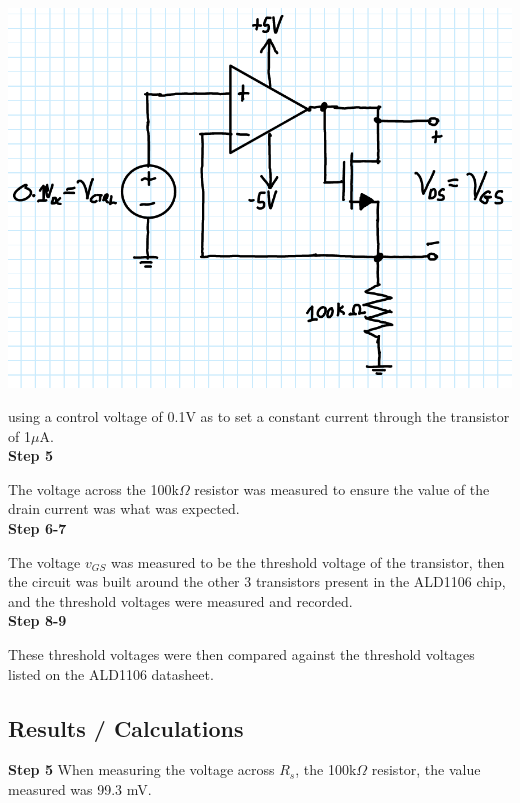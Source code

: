 \documentclass[notitlepage, 12pt]{report}  %
\begin{document}
\begin{center}
    \includegraphics[scale=0.35]{fig3.2.png}
\end{center}

using a control voltage of 0.1V as to set a constant current through the transistor of 1$\mu$A.\\

\textbf{Step 5}

The voltage across the 100k$\Omega$ resistor was measured to ensure the value of the drain current was what 
was expected. \\  

\textbf{Step 6-7}

The voltage $v_{GS}$ was measured to be the threshold voltage of the transistor, then the circuit was built around 
the other 3 transistors present in the ALD1106 chip, and the threshold voltages were measured and recorded.\\

\textbf{Step 8-9}

These threshold voltages were then compared against the threshold voltages listed on the ALD1106 datasheet.



\subsection*{Results / Calculations}

\textbf{Step 5}
When measuring the voltage across $R_s$, the 100k$\Omega$ resistor, the value measured was 99.3 mV. \\
\end{document}
